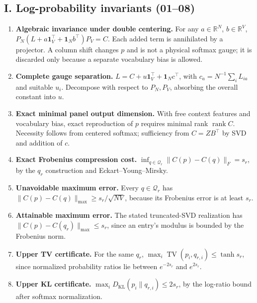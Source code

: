 \documentclass[11pt,a4paper,oneside]{book}
\newcommand{\R}{\mathbb R}\newcommand{\C}{\mathbb C}\newcommand{\Z}{\mathbb Z}\newcommand{\N}{\mathbb N}\newcommand{\Q}{\mathbb Q}
\newcommand{\one}{\mathbf 1}\newcommand{\ii}{\mathrm i}\newcommand{\dd}{\mathrm d}
\DeclareMathOperator{\rank}{rank}\DeclareMathOperator{\Tr}{Tr}
\begin{document}
\subsection*{I. Log-probability invariants (01--08)}
\begin{enumerate}
\item \textbf{Algebraic invariance under double centering.} For any $a\in\R^N$, $b\in\R^V$, $P_N(L+a\one_V^\top+\one_Nb^\top)P_V=C$. Each added term is annihilated by a projector. A column shift changes $p$ and is not a physical softmax gauge; it is discarded only because a separate vocabulary bias is allowed.
\item \textbf{Complete gauge separation.} $L=C+u\one_V^\top+\one_Nc^\top$, with $c_a=N^{-1}\sum_iL_{ia}$ and suitable $u_i$. Decompose with respect to $P_N,P_V$, absorbing the overall constant into $u$.
\item \textbf{Exact minimal panel output dimension.} With free context features and vocabulary bias, exact reproduction of $p$ requires minimal rank $\rank C$. Necessity follows from centered softmax; sufficiency from $C=ZB^\top$ by SVD and addition of $c$.
\item \textbf{Exact Frobenius compression cost.} $\inf_{q\in\mathcal Q_r}\|C(p)-C(q)\|_F=s_r$, by the $q_r$ construction and Eckart--Young--Mirsky.
\item \textbf{Unavoidable maximum error.} Every $q\in\mathcal Q_r$ has $\|C(p)-C(q)\|_{\max}\ge s_r/\sqrt{NV}$, because its Frobenius error is at least $s_r$.
\item \textbf{Attainable maximum error.} The stated truncated-SVD realization has $\|C(p)-C(q_r)\|_{\max}\le s_r$, since an entry's modulus is bounded by the Frobenius norm.
\item \textbf{Upper TV certificate.} For the same $q_r$, $\max_i\operatorname{TV}(p_i,q_{r,i})\le\tanh s_r$, since normalized probability ratios lie between $e^{-2s_r}$ and $e^{2s_r}$.
\item \textbf{Upper KL certificate.} $\max_iD_{\mathrm{KL}}(p_i\|q_{r,i})\le2s_r$, by the log-ratio bound after softmax normalization.
\end{enumerate}
\end{document}

